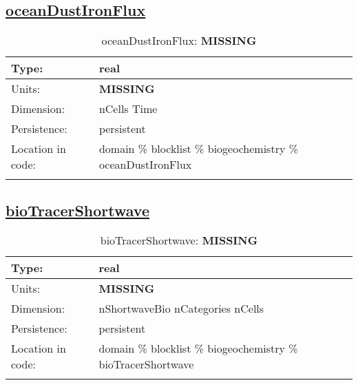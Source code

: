 \subsection[oceanDustIronFlux]{\hyperref[sec:var_tab_biogeochemistry]{oceanDustIronFlux}}
\label{subsec:var_sec_biogeochemistry_oceanDustIronFlux}
\begin{center}
\begin{longtable}{| p{2.0in} | p{4.0in} |}
        \hline 
        Type: & real \\
        \hline 
        Units: & {\bf \color{red} MISSING} \\
        \hline 
        Dimension: & nCells Time \\
        \hline 
        Persistence: & persistent \\
        \hline 
         Location in code: & domain \% blocklist \% biogeochemistry \% oceanDustIronFlux \\
         \hline 
    \caption{oceanDustIronFlux: {\bf \color{red} MISSING}}
\end{longtable}
\end{center}
\subsection[bioTracerShortwave]{\hyperref[sec:var_tab_biogeochemistry]{bioTracerShortwave}}
\label{subsec:var_sec_biogeochemistry_bioTracerShortwave}
\begin{center}
\begin{longtable}{| p{2.0in} | p{4.0in} |}
        \hline 
        Type: & real \\
        \hline 
        Units: & {\bf \color{red} MISSING} \\
        \hline 
        Dimension: & nShortwaveBio nCategories nCells \\
        \hline 
        Persistence: & persistent \\
        \hline 
         Location in code: & domain \% blocklist \% biogeochemistry \% bioTracerShortwave \\
         \hline 
    \caption{bioTracerShortwave: {\bf \color{red} MISSING}}
\end{longtable}
\end{center}
